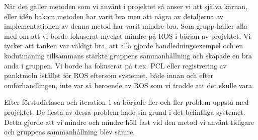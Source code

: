 När det gäller metoden som vi använt i projektet så anser vi att själva kärnan, eller idén bakom metoden har varit bra men att några av detaljerna av implementationen av denna metod har varit mindre bra. Som grupp håller alla med om att vi borde fokuserat mycket mindre på ROS i början av projektet. Vi tycker att tanken var väldigt bra, att alla gjorde handledningsexempel och en kodutmaning tillsammans stärkte gruppens sammanhållning och skapade en bra anda i gruppen. Vi borde ha fokuserat på t.ex. PCL eller registrering av punktmoln istället för ROS eftersom systemet, både innan och efter omförhandlingen, inte var så beroende av ROS som vi trodde att det skulle vara.

Efter förstudiefasen och iteration 1 så började fler och fler problem uppstå med projektet. De flesta av dessa problem hade sin grund i det befintliga systemet. Detta gjorde att vi mindre och mindre höll fast vid den metod vi använt tidigare och gruppens sammanhållning blev sämre.      





